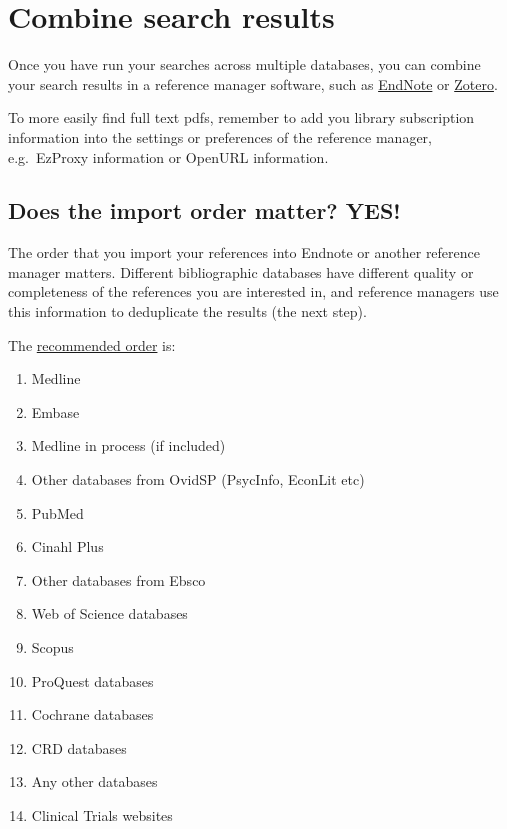 \documentclass[
]{book}
\providecommand{\tightlist}{%
  \setlength{\itemsep}{0pt}\setlength{\parskip}{0pt}}
\begin{document}
\section{Combine search results}\label{combine-search-results}

Once you have run your searches across multiple databases, you can combine your search results in a reference manager software, such as \href{https://endnote.com/}{EndNote} or \href{https://www.zotero.org/}{Zotero}.

To more easily find full text pdfs, remember to add you library subscription information into the settings or preferences of the reference manager, e.g.~EzProxy information or OpenURL information.

\subsection{Does the import order matter? YES!}\label{does-the-import-order-matter-yes}

The order that you import your references into Endnote or another reference manager matters. Different bibliographic databases have different quality or completeness of the references you are interested in, and reference managers use this information to deduplicate the results (the next step).

The \href{https://blogs.lshtm.ac.uk/library/2018/12/07/removing-duplicates-from-an-endnote-library/}{recommended order} is:

\begin{enumerate}
\def\labelenumi{\arabic{enumi}.}
\tightlist
\item
  Medline
\item
  Embase
\item
  Medline in process (if included)
\item
  Other databases from OvidSP (PsycInfo, EconLit etc)
\item
  PubMed
\item
  Cinahl Plus
\item
  Other databases from Ebsco
\item
  Web of Science databases
\item
  Scopus
\item
  ProQuest databases
\item
  Cochrane databases
\item
  CRD databases
\item
  Any other databases
\item
  Clinical Trials websites
\end{enumerate}
\end{document}
